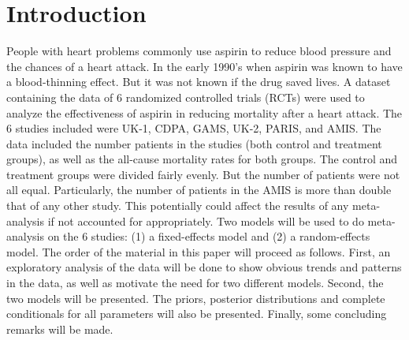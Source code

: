 \documentclass{../../tex_template/asaproc}
\begin{document}
\section{Introduction}
People with heart problems commonly use aspirin to reduce blood pressure and
the chances of a heart attack. In the early 1990's when aspirin was known to
have a blood-thinning effect. But it was not known if the drug saved lives.  A
dataset containing the data of 6 randomized controlled trials (RCTs) were used
to analyze the effectiveness of aspirin in reducing mortality after a heart
attack. The 6 studies included were UK-1, CDPA, GAMS, UK-2, PARIS, and AMIS.
The data included the number patients in the studies (both control and
treatment groups), as well as the all-cause mortality rates for both groups.
The control and treatment groups were divided fairly evenly. But the number of
patients were not all equal. Particularly, the number of patients in the AMIS
is more than double that of any other study. This potentially could affect the
results of any meta-analysis if not accounted for appropriately. Two models
will be used to do meta-analysis on the 6 studies: (1) a fixed-effects model
and (2) a random-effects model. The order of the material in this paper will
proceed as follows. First, an exploratory analysis of the data will be done to
show obvious trends and patterns in the data, as well as motivate the need for
two different models. Second, the two models will be presented. The priors,
posterior distributions and complete conditionals for all parameters will also
be presented. Finally, some concluding remarks will be made.
\end{document}
